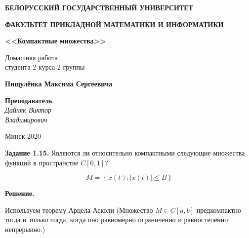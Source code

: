 \documentclass[12pt, a4paper]{article}
\begin{document}
\begin{titlepage}


  
  \bigskip
  \centerline{\large \bf БЕЛОРУССКИЙ ГОСУДАРСТВЕННЫЙ УНИВЕРСИТЕТ}
  \bigskip
  \bigskip  
  \centerline{\large \bf ФАКУЛЬТЕТ ПРИКЛАДНОЙ МАТЕМАТИКИ И ИНФОРМАТИКИ}
  \vfill
  \vfill
  \vfill
  \centerline{\large \bf <<Компактные множества>>}
  \bigskip
  \bigskip
  \vfill
  \begin{centering}
    {\large
    Домашняя работа\\
    студента 2 курса 2 группы \\}
  \end{centering}
  \centerline{\large \bf Пищулёнка Максима Сергеевича}
  \vfill
  \vfill
  \hfill
  \begin{minipage}{0.25\textwidth}
    {\large{\bf Преподаватель} \\
  {\it Дайняк Виктор \\ Владимирович}}
  \end{minipage}
  \vfill
  \vfill
  \centerline{\large Минск 2020}
  
  \end{titlepage}

\begin{center}
\end{center}

\textbf{Задание 1.15.} Являются ли относительно компактными следующие множества 
функций в пространстве $C[0, 1]$?

\[M = \left\{ x(t) : |x(t)|\le B\right\}\]

\textbf{Решение.}

Используем теорему Арцела-Асколи (Множество $M\in C[a, b]$ предкомпактно
тогда и только тогда, когда оно равномерно ограниченно и равностепенно 
непрерывно.)
\end{document}
